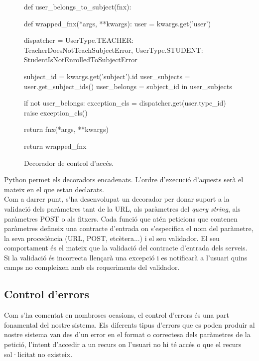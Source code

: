 \begin{figure}[h!]
	\begin{python}
def user_belongs_to_subject(fnx):
	
	def wrapped_fnx(*args, **kwargs):
		user = kwargs.get('user')
		
		dispatcher = {
			UserType.TEACHER: TeacherDoesNotTeachSubjectError,
			UserType.STUDENT: StudentIsNotEnrolledToSubjectError
		}
		
		subject_id = kwargs.get('subject').id
		user_subjects = user.get_subject_ids()
		user_belongs = subject_id in user_subjects
		
		if not user_belongs:
			exception_cls = dispatcher.get(user.type_id)
			raise exception_cls()
		
		return fnx(*args, **kwargs)

	return wrapped_fnx
	\end{python}
	\label{fig:decorador_control_acces}
	\caption{Decorador de control d'accés.}
\end{figure}

Python permet els decoradors encadenats. L'ordre d'execució d'aquests serà el mateix en el que estan declarats. \\

Com a darrer punt, s'ha desenvolupat un decorador per donar suport a la validació dels paràmetres tant de la \ac{URL}, als paràmetres del \emph{query string}, als paràmetres POST o als fitxers. Cada funció que atén peticions que contenen paràmetres defineix una contracte d'entrada on s'especifica el nom del paràmetre, la seva procedència (\ac{URL}, POST, etcètera...) i el seu validador. El seu comportament és el mateix que la validació del contracte d'entrada dels serveis. Si la validació és incorrecta llençarà una excepció i es notificarà a l'usuari quins camps no compleixen amb els requeriments del validador.

\subsection{Control d'errors} \label{control_errors}

Com s'ha comentat en nombroses ocasions, el control d'errors és una part fonamental del nostre sistema. Els diferents tipus d'errors que es poden produir al nostre sistema van des d'un error en el format o correctesa dels paràmetres de la petició, l'intent d'accedir a un recurs on l'usuari no hi té accés o que el recurs sol·licitat no existeix.\\

